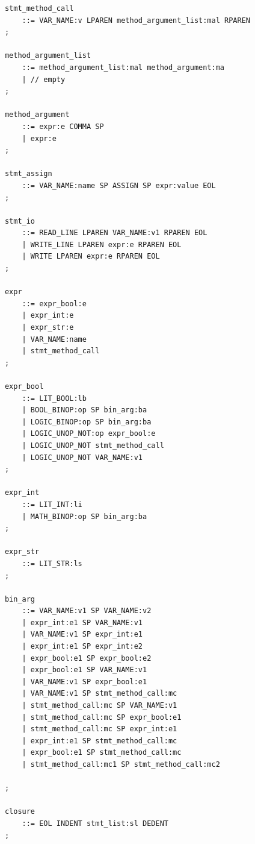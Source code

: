 \documentclass[spanish]{article}
\begin{document}
\begin{lstlisting}
            stmt_method_call
            	::= VAR_NAME:v LPAREN method_argument_list:mal RPAREN
            ;
            
            method_argument_list
            	::= method_argument_list:mal method_argument:ma
            	| // empty
            ;
            
            method_argument
            	::= expr:e COMMA SP
            	| expr:e
            ;
            
            stmt_assign
            	::= VAR_NAME:name SP ASSIGN SP expr:value EOL
            ;
            
            stmt_io
            	::= READ_LINE LPAREN VAR_NAME:v1 RPAREN EOL
            	| WRITE_LINE LPAREN expr:e RPAREN EOL
            	| WRITE LPAREN expr:e RPAREN EOL
            ;
            
            expr
            	::= expr_bool:e
            	| expr_int:e
            	| expr_str:e
            	| VAR_NAME:name
            	| stmt_method_call
            ;
            
            expr_bool
            	::= LIT_BOOL:lb
            	| BOOL_BINOP:op SP bin_arg:ba
            	| LOGIC_BINOP:op SP bin_arg:ba
            	| LOGIC_UNOP_NOT:op expr_bool:e
            	| LOGIC_UNOP_NOT stmt_method_call
            	| LOGIC_UNOP_NOT VAR_NAME:v1
            ;
            
            expr_int
            	::= LIT_INT:li
            	| MATH_BINOP:op SP bin_arg:ba
            ;
            
            expr_str
            	::= LIT_STR:ls
            ;
            
            bin_arg
                ::= VAR_NAME:v1 SP VAR_NAME:v2
                | expr_int:e1 SP VAR_NAME:v1
                | VAR_NAME:v1 SP expr_int:e1
                | expr_int:e1 SP expr_int:e2
                | expr_bool:e1 SP expr_bool:e2
                | expr_bool:e1 SP VAR_NAME:v1
                | VAR_NAME:v1 SP expr_bool:e1
                | VAR_NAME:v1 SP stmt_method_call:mc	
                | stmt_method_call:mc SP VAR_NAME:v1
                | stmt_method_call:mc SP expr_bool:e1
                | stmt_method_call:mc SP expr_int:e1
                | expr_int:e1 SP stmt_method_call:mc
                | expr_bool:e1 SP stmt_method_call:mc
                | stmt_method_call:mc1 SP stmt_method_call:mc2
                    
            ;
            
            closure
            	::= EOL INDENT stmt_list:sl DEDENT
            ;
        \end{lstlisting}

        \clearpage
        {}
        
\end{document}
